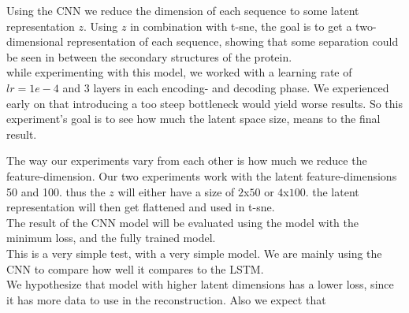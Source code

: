 Using the CNN we reduce the dimension of each sequence to some latent representation $z$. Using $z$ in combination with t-sne, the goal is to get a two-dimensional representation of each sequence, showing that some separation could be seen in between the secondary structures of the protein. \\

\noindent
while experimenting with this model, we worked with a learning rate of $lr=1e-4$ and 3 layers in each encoding- and decoding phase. We experienced early on that introducing a too steep bottleneck would yield worse results. So this experiment's goal is to see how much the latent space size, means to the final result.

\noindent
The way our experiments vary from each other is how much we reduce the feature-dimension. Our two experiments work with the latent feature-dimensions 50 and 100. thus the $z$ will either have a size of $2$x$50$ or $4$x$100$. the latent representation will then get flattened and used in t-sne. \\

\noindent
The result of the CNN model will be evaluated using the model with the minimum loss, and the fully trained model. \\

\noindent
This is a very simple test, with a very simple model. We are mainly using the CNN to compare how well it compares to the LSTM. \\

\noindent
We hypothesize that model with higher latent dimensions has a lower loss, since it has more data to use in the reconstruction. Also we expect that